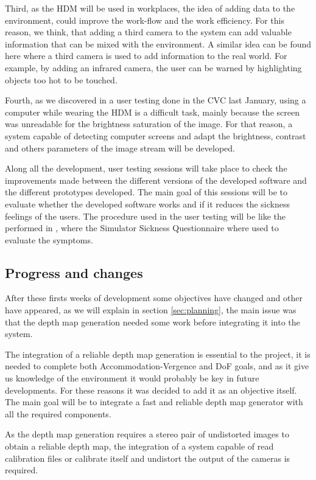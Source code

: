 \documentclass[10pt,a4paper,twocolumn,twoside]{article}
\begin{document}
	Third, as the HDM will be used in workplaces, the idea of adding data to the environment, could improve the work-flow and the work efficiency. For this reason, we think, that adding a third camera to the system can add valuable information that can be mixed with the environment. A similar idea can be found here \cite{vismerge} where a third camera is used to add information to the real world. For example, by adding an infrared camera, the user can be warned by highlighting objects too hot to be touched.
	
	Fourth, as we discovered in a user testing done in the CVC \cite{unpublishCVC} last January, using a computer while wearing the HDM is a difficult task, mainly because the screen was unreadable for the brightness saturation of the image. For that reason, a system capable of detecting computer screens and adapt the brightness, contrast and others parameters of the image stream will be developed.
	
	Along all the development, user testing sessions will take place to check the improvements made between the different versions of the developed software and the different prototypes developed. The main goal of this sessions will be to evaluate whether the developed software works and if it reduces the sickness feelings of the users. The procedure used in the user testing will be like the performed in \cite{ifftConfortDoF}, where the Simulator Sickness Questionnaire \cite{ssqQuestion} where used to evaluate the symptoms. 
	
	\subsection{Progress and changes}
	
	After these firsts weeks of development some objectives have changed and other have appeared, as we will explain in section \ref{sec:planning}, the main issue was that the depth map generation needed some work before integrating it into the system.
	
	The integration of a reliable depth map generation is essential to the project, it is needed to complete both Accommodation-Vergence and DoF goals, and as it give us knowledge of the environment it would probably be key in future developments. For these reasons it was decided to add it as an objective itself. The main goal will be to integrate a fast and reliable depth map generator with all the required components.
	
	As the depth map generation requires a stereo pair of undistorted images to obtain a reliable depth map, the integration of a system capable of read calibration files or calibrate itself and undistort the output of the cameras is required.  
\end{document}
